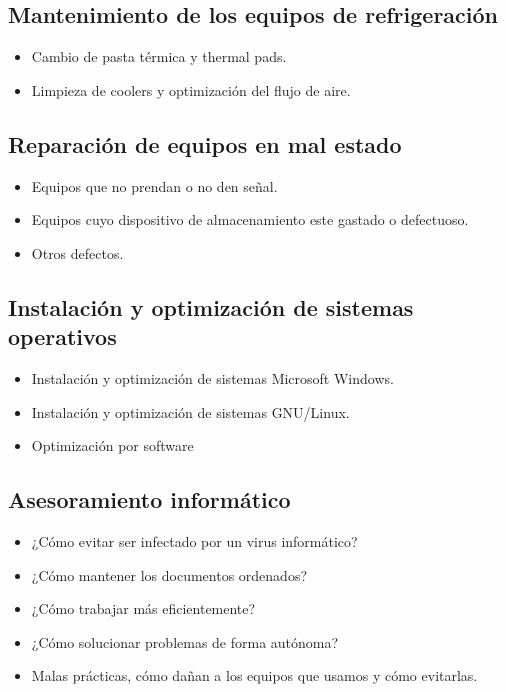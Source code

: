 \documentclass{article}
\begin{document}
	\subsection{Mantenimiento de los equipos de refrigeración}
		\begin{itemize}
		\item Cambio de pasta térmica y thermal pads.
		\item Limpieza de coolers y optimización del flujo de aire.
		\end{itemize}
	
	\subsection{Reparación de equipos en mal estado}
		\begin{itemize}
		\item Equipos que no prendan o no den señal.
		\item Equipos cuyo dispositivo de almacenamiento este gastado o defectuoso.
		\item Otros defectos.
		\end{itemize}
	
	\subsection{Instalación y optimización de sistemas operativos}
		\begin{itemize}
		\item Instalación y optimización de sistemas Microsoft Windows.
		\item Instalación y optimización de sistemas GNU/Linux.
		\item Optimización por software
		\end{itemize}
	
	\subsection{Asesoramiento informático}
		\begin{itemize}
		\item ¿Cómo evitar ser infectado por un virus informático?
		\item ¿Cómo mantener los documentos ordenados?
		\item ¿Cómo trabajar más eficientemente?
		\item ¿Cómo solucionar problemas de forma autónoma?
		\item Malas prácticas, cómo dañan a los equipos que usamos y cómo evitarlas.
		\end{itemize}
\end{document}
